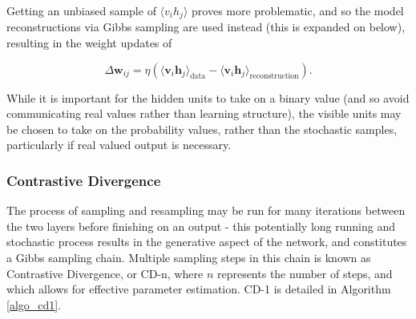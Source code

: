 \documentclass[a4paper,11pt,oneside]{article}
\theoremstyle{plain}
\theoremstyle{definition}
\begin{document}
	
	Getting an unbiased sample of $\langle v_i h_j \rangle$ proves more problematic, and so the model reconstructions via Gibbs sampling are used instead (this is expanded on below), resulting in the weight updates of
	
	\begin{equation}
	\Delta \mathbf{w}_{ij} = \eta (\langle \mathbf{v}_i\mathbf{h}_j\rangle_{\mathrm{data}} - \langle \mathbf{v}_i\mathbf{h}_j\rangle_{\mathrm{reconstruction}}).
	\end{equation}
	
	While it is important for the hidden units to take on a binary value (and so avoid communicating real values rather than learning structure), the visible units may be chosen to take on the probability values, rather than the stochastic samples, particularly if real valued output is necessary. 
	
	\subsubsection{Contrastive Divergence}\label{imp_CD}
	
	The process of sampling and resampling may be run for many iterations between the two layers before finishing on an output - this potentially long running and stochastic process results in the generative aspect of the network, and constitutes a Gibbs sampling chain. Multiple sampling steps in this chain is known as Contrastive Divergence, or CD-n, where $n$ represents the number of steps, and which allows for effective parameter estimation. CD-1 is detailed in Algorithm \ref{algo_cd1}.\newline
	
\end{document}
